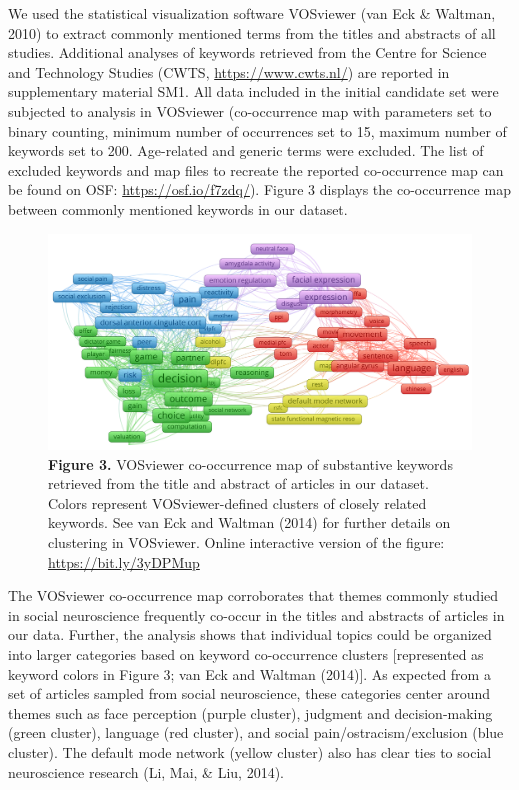 \documentclass[
  man,floatsintext]{apa6}
\begin{document}
We used the statistical visualization software VOSviewer (van Eck \& Waltman, 2010) to extract commonly mentioned terms from the titles and abstracts of all studies. Additional analyses of keywords retrieved from the Centre for Science and Technology Studies (CWTS, \url{https://www.cwts.nl/}) are reported in supplementary material SM1. All data included in the initial candidate set were subjected to analysis in VOSviewer (co-occurrence map with parameters set to binary counting, minimum number of occurrences set to 15, maximum number of keywords set to 200. Age-related and generic terms were excluded. The list of excluded keywords and map files to recreate the reported co-occurrence map can be found on OSF: \url{https://osf.io/f7zdq/}). Figure 3 displays the co-occurrence map between commonly mentioned keywords in our dataset.

\begin{figure}
\centering
\includegraphics{vosviewer_label_cooccurence.png}
\caption{\textbf{Figure 3.} VOSviewer co-occurrence map of substantive keywords retrieved from the title and abstract of articles in our dataset. Colors represent VOSviewer-defined clusters of closely related keywords. See van Eck and Waltman (2014) for further details on clustering in VOSviewer. Online interactive version of the figure: \url{https://bit.ly/3yDPMup}}
\end{figure}

The VOSviewer co-occurrence map corroborates that themes commonly studied in social neuroscience frequently co-occur in the titles and abstracts of articles in our data. Further, the analysis shows that individual topics could be organized into larger categories based on keyword co-occurrence clusters {[}represented as keyword colors in Figure 3; van Eck and Waltman (2014){]}. As expected from a set of articles sampled from social neuroscience, these categories center around themes such as face perception (purple cluster), judgment and decision-making (green cluster), language (red cluster), and social pain/ostracism/exclusion (blue cluster). The default mode network (yellow cluster) also has clear ties to social neuroscience research (Li, Mai, \& Liu, 2014).
\end{document}
